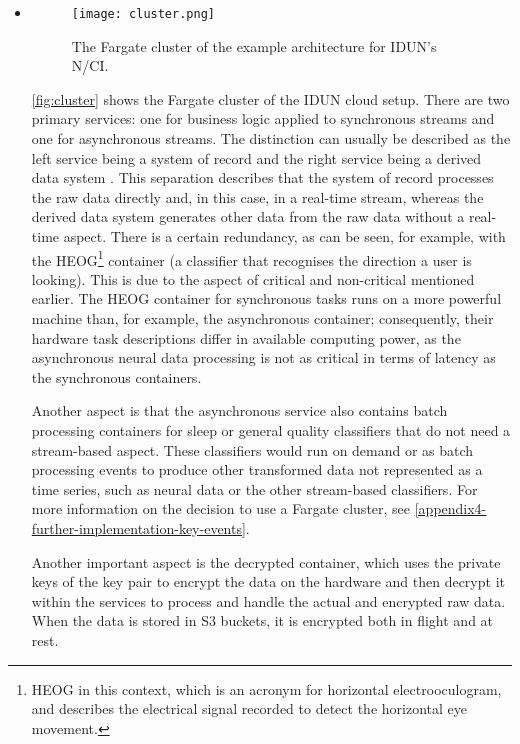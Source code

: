 \begin{itemize}

  \item \begin{figure}[!ht]
          \centering
          \texttt{[image: cluster.png]}
          \caption{The Fargate cluster of the example architecture for IDUN’s N/CI.}
          \label{fig:cluster}
        \end{figure}

        \autoref{fig:cluster} shows the Fargate cluster of the IDUN cloud setup. There are two primary services: one for business logic applied to synchronous streams and one for asynchronous streams. The distinction can usually be described as the left service being a system of record and the right service being a derived data system \citep{kleppmann_designing_2017}. This separation describes that the system of record processes the raw data directly and, in this case, in a real-time stream, whereas the derived data system generates other data from the raw data without a real-time aspect. There is a certain redundancy, as can be seen, for example, with the HEOG\footnote{HEOG in this context, which is an acronym for horizontal electrooculogram, and describes the electrical signal recorded to detect the horizontal eye movement.} container (a classifier that recognises the direction a user is looking). This is due to the aspect of critical and non-critical mentioned earlier. The HEOG container for synchronous tasks runs on a more powerful machine than, for example, the asynchronous container; consequently, their hardware task descriptions differ in available computing power, as the asynchronous neural data processing is not as critical in terms of latency as the synchronous containers.

        Another aspect is that the asynchronous service also contains batch processing containers for sleep or general quality classifiers that do not need a stream-based aspect. These classifiers would run on demand or as batch processing events to produce other transformed data not represented as a time series, such as neural data or the other stream-based classifiers. For more information on the decision to use a Fargate cluster, see \autoref{appendix4-further-implementation-key-events}.

        Another important aspect is the decrypted container, which uses the private keys of the key pair to encrypt the data on the hardware and then decrypt it within the services to process and handle the actual and encrypted raw data. When the data is stored in S3 buckets, it is encrypted both in flight and at rest.


\end{itemize}
